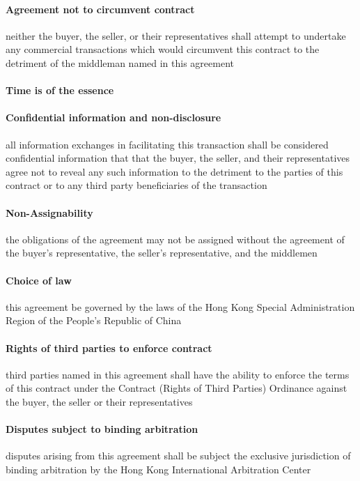 \documentclass[10pt]{article}
\begin{document}
\paragraph{Agreement not to circumvent contract} neither the buyer, the seller, or their representatives shall attempt to undertake any commercial transactions which would circumvent this contract to the detriment of the middleman named in this agreement

\paragraph{Time is of the essence}

\paragraph{Confidential information and non-disclosure} all
information exchanges in facilitating this transaction shall be
considered confidential information that that the buyer, the seller,
and their representatives agree not to reveal any such information to
the detriment to the parties of this contract or to any third party
beneficiaries of the transaction

\paragraph{Non-Assignability} the obligations of the agreement may not
be assigned without the agreement of the buyer's representative, the
seller's representative, and the middlemen

\paragraph{Choice of law} this agreement be governed by the laws of the Hong Kong Special Administration Region of the People’s Republic of China

\paragraph{Rights of third parties to enforce contract} third parties named in this agreement shall have the ability to enforce the terms of this contract under the Contract (Rights of Third Parties) Ordinance against the buyer, the seller or their representatives

\paragraph{Disputes subject to binding arbitration} disputes arising from this agreement shall be subject the exclusive
jurisdiction of binding arbitration by the Hong Kong International
Arbitration Center
\end{document}
